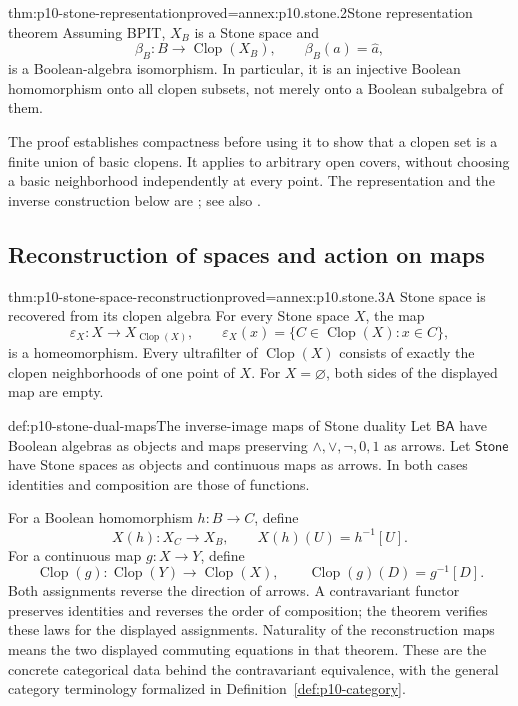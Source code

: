 \begin{hbtheorem}{thm:p10-stone-representation}{proved=annex:p10.stone.2}{Stone representation theorem}
Assuming BPIT, \(X_B\) is a Stone space and
\[
 \beta_B:B\longrightarrow\operatorname{Clop}(X_B),
 \qquad \beta_B(a)=\widehat a,
\]
is a Boolean-algebra isomorphism.
In particular, it is an injective Boolean homomorphism onto all
clopen subsets, not merely onto a Boolean subalgebra of them.
\end{hbtheorem}

The proof establishes compactness before using it to show that a
clopen set is a finite union of basic clopens. It applies to arbitrary
open covers, without choosing a basic neighborhood independently at
every point.
The representation and the inverse construction below are
\cite[IV\S4, Theorem~4.6, pp.~136--138]{BurrisSankappanavar2012};
see also \textcite{Stone1936,Johnstone1982,GivantHalmos2009}.

\subsection{Reconstruction of spaces and action on maps}
\label{sec:p10-stone-reconstruction}

\begin{hbtheorem}{thm:p10-stone-space-reconstruction}{proved=annex:p10.stone.3}{A Stone space is recovered from its clopen algebra}
For every Stone space \(X\), the map
\[
 \varepsilon_X:X\longrightarrow X_{\operatorname{Clop}(X)},
 \qquad
 \varepsilon_X(x)=\{C\in\operatorname{Clop}(X):x\in C\},
\]
is a homeomorphism.
Every ultrafilter of \(\operatorname{Clop}(X)\) consists of exactly
the clopen neighborhoods of one point of \(X\).
For \(X=\varnothing\), both sides of the displayed map are empty.
\end{hbtheorem}

\begin{hbdefinition}{def:p10-stone-dual-maps}{The inverse-image maps of Stone duality}
Let \(\mathsf{BA}\) have Boolean algebras as objects and maps
preserving \(\wedge,\vee,\neg,0,1\) as arrows.
Let \(\mathsf{Stone}\) have Stone spaces as objects and continuous
maps as arrows. In both cases identities and composition are those
of functions.

For a Boolean homomorphism \(h:B\to C\), define
\[
 X(h):X_C\longrightarrow X_B,\qquad X(h)(U)=h^{-1}[U].
\]
For a continuous map \(g:X\to Y\), define
\[
 \operatorname{Clop}(g):
 \operatorname{Clop}(Y)\longrightarrow\operatorname{Clop}(X),
 \qquad \operatorname{Clop}(g)(D)=g^{-1}[D].
\]
Both assignments reverse the direction of arrows.
A contravariant functor preserves identities and reverses the order
of composition; the theorem verifies these laws for the displayed
assignments. Naturality of the reconstruction maps means the two
displayed commuting equations in that theorem.
These are the concrete categorical data behind the contravariant
equivalence, with the general category terminology formalized in
Definition~\ref{def:p10-category}.
\end{hbdefinition}

